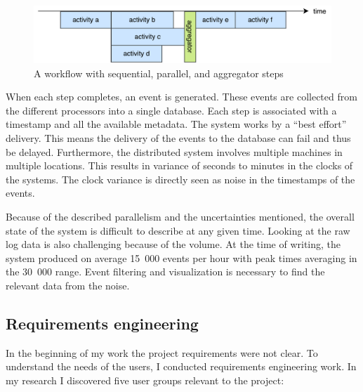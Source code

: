 \begin{figure}[htb]
\centering \includegraphics[width=0.9\linewidth]{gfx/figures/workflow.pdf}
\caption{A workflow with sequential, parallel, and aggregator steps}
\label{fig:workflowexample}
\end{figure}

When each step completes, an event is generated.
These events are collected from the different processors into a single database.
Each step is associated with a timestamp and all the available metadata.
The system works by a ``best effort'' delivery. 
This means the delivery of the events to the database can fail and thus be delayed.
Furthermore, the distributed system involves multiple machines in multiple locations. 
This results in variance of seconds to minutes in the clocks of the systems.
The clock variance is directly seen as noise in the timestamps of the events.

Because of the described parallelism and the uncertainties mentioned, the overall state of the system is difficult to describe at any given time.
Looking at the raw log data is also challenging because of the volume.
At the time of writing, the system produced on average 15~000 events per hour with peak times averaging in the 30~000 range.
Event filtering and visualization is necessary to find the relevant data from the noise.

\subsection{Requirements engineering}

In the beginning of my work the project requirements were not clear.
To understand the needs of the users, I conducted requirements engineering work.
In my research I discovered five user groups relevant to the project:

